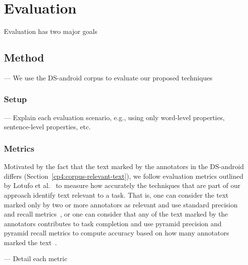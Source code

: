 \section{Evaluation}
\label{cp5:evaluation}




Evaluation has two major goals



\subsection{Method}



--- We use the \acs{DS-android} corpus to evaluate our proposed techniques  \vspace{3mm}


\subsubsection{Setup}

--- Explain each evaluation scenario, e.g., using only word-level properties, sentence-level properties, etc.



\subsubsection{Metrics}






Motivated by the fact that the text marked by the annotators in the \acs{DS-android} differs
(Section~\ref{cp4:corpus-relevant-text}),
we follow evaluation metrics outlined by Lotufo et al.~\cite{Lotufo2012}
to measure how accurately the techniques that are part of our approach identify text relevant to a task.
That is,
one can consider the text marked only by two or more annotators as relevant
and use standard precision and recall metrics~\cite{Manning2009IR}, or one can consider that
any of the text marked by the annotators 
contributes to task completion and use pyramid 
precision and pyramid recall metrics
to compute accuracy based on how many annotators marked the text~\cite{Nenkova2004, Lotufo2012}. 


--- Detail each metric





